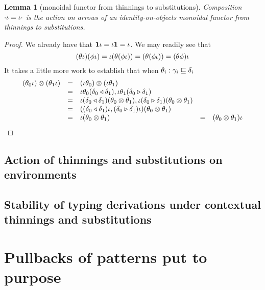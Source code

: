 \documentclass{jfp1}
\newtheorem{lemma}[theorem]{Lemma}
\begin{document}
\begin{lemma}[monoidal functor from thinnings to substitutions]
  Composition $\cdot\iota = \iota\cdot$ is the action on arrows of an identity-on-objects
  monoidal functor from thinnings to substitutions.
\end{lemma}
\begin{proof}
  We already have that $\mathbf{1}\iota = \iota\mathbf{1} = \iota$. We may readily see that
  \[(\theta\iota)(\phi\iota)=\iota(\theta(\phi\iota))=(\theta(\phi\iota))
    = (\theta\phi)\iota \]
  It takes a little more work to establish that when
  $\theta_i:\gamma_i\sqsubseteq\delta_i$
  \[\begin{array}{lclcl}
    (\theta_0\iota)\otimes(\theta_1\iota) & = &
      (\iota\theta_0)\otimes(\iota\theta_1)\\
    &= &
        \iota\theta_0(\delta_0 \triangleleft \delta_1),\iota\theta_1(\delta_0 \triangleright \delta_1) \\
    &= &
    \iota(\delta_0 \triangleleft \delta_1)(\theta_0\otimes\theta_1), 
    \iota(\delta_0 \triangleright \delta_1)(\theta_0\otimes\theta_1) \\
    &= &
    ((\delta_0 \triangleleft \delta_1)\iota,(\delta_0 \triangleright \delta_1)\iota)(\theta_0\otimes\theta_1) \\
    &= &
    \iota (\theta_0\otimes\theta_1)
    &=&(\theta_0\otimes\theta_1)\iota
    \end{array}\]
\end{proof}


\subsection{Action of thinnings and substitutions on environments}


\subsection{Stability of typing derivations under contextual thinnings
and substitutions}


\section{Pullbacks of patterns put to purpose}
\end{document}
